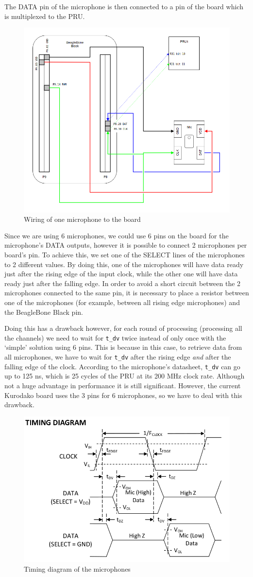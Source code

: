 \documentclass[]{report}
\begin{document}
The DATA pin of the microphone is then connected to a pin of the board which is multiplexed to the PRU.

\begin{figure}[h]
\centering
\includegraphics[width=0.6\linewidth]{Pictures/wiring.png}
\caption{Wiring of one microphone to the board}
\end{figure}

Since we are using 6 microphones, we could use 6 pins on the board for the microphone's DATA outputs, however it is possible to connect 2 microphones per board's pin. To achieve this, we set one of the SELECT lines of the microphones to 2 different values. By doing this, one of the microphones will have data ready just after the rising edge of the input clock, while the other one will have data ready just after the falling edge. In order to avoid a short circuit between the 2 microphones connected to the same pin, it is necessary to place a resistor between one of the microphones (for example, between all rising edge microphones) and the BeagleBone Black pin.

Doing this has a drawback however, for each round of processing (processing all the channels) we need to wait for \texttt{t\_dv} twice instead of only once with the `simple' solution using 6 pins. This is because in this case, to retrieve data from all microphones, we have to wait for \texttt{t\_dv} after the rising edge \emph{and} after the falling edge of the clock. According to the microphone's datasheet, \texttt{t\_dv} can go up to 125 ns, which is 25 cycles of the PRU at its 200 MHz clock rate. Although not a huge advantage in performance it is still significant. However, the current Kurodako board uses the 3 pins for 6 microphones, so we have to deal with this drawback.

\begin{figure}[h]
\centering
\includegraphics[width=0.6\linewidth]{Pictures/timing_diagram.png}
\caption{Timing diagram of the microphones}
\end{figure}
\end{document}
